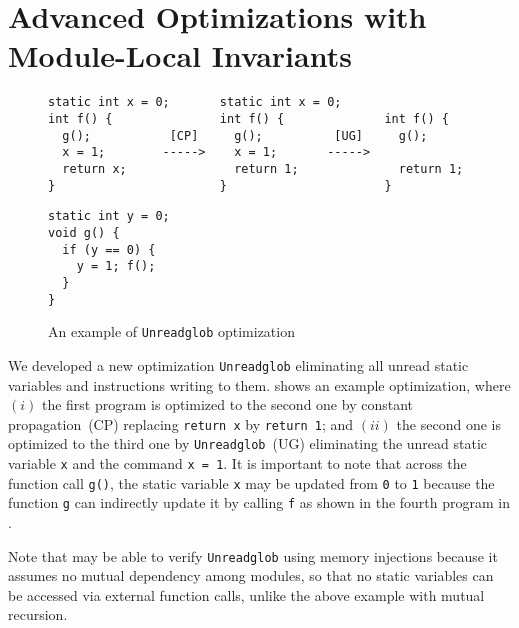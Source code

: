 \section{Advanced Optimizations with Module-Local Invariants}
\label{sec:compiler:advanced}

\begin{figure}[t]
\begin{Verbatim}
static int x = 0;       static int x = 0;                   
int f() {               int f() {              int f() {    
  g();           [CP]     g();          [UG]     g();       
  x = 1;        ----->    x = 1;       ----->               
  return x;               return 1;              return 1;  
}                       }                      }            
\end{Verbatim}
\begin{Verbatim}
static int y = 0;
void g() {
  if (y == 0) {
    y = 1; f();
  }
}                 
\end{Verbatim}
\caption{An example of \texttt{Unreadglob} optimization}
\label{fig:overview-modulelocal:compiler}
\end{figure}

We developed a new optimization \texttt{Unreadglob} eliminating all
unread static variables and instructions writing to them.
 shows an example
optimization, where $(i)$ the first program is optimized to the second
one by constant propagation~(CP) replacing \texttt{return x} by
\texttt{return 1}; and $(ii)$ the second one is optimized to the third
one by \texttt{Unreadglob}~(UG) eliminating the unread static variable
\texttt{x} and the command \texttt{x = 1}.  It is important to note
that across the function call \texttt{g()}, the static variable
\texttt{x} may be updated from \texttt{0} to \texttt{1} because the
function \texttt{g} can indirectly update it by calling \texttt{f} as shown in
the fourth program in .


Note that \ccx{} may be
able to verify \texttt{Unreadglob} using memory injections because it
assumes no mutual dependency among modules, so that no static
variables can be accessed via external function calls, unlike the above
example with mutual recursion.
